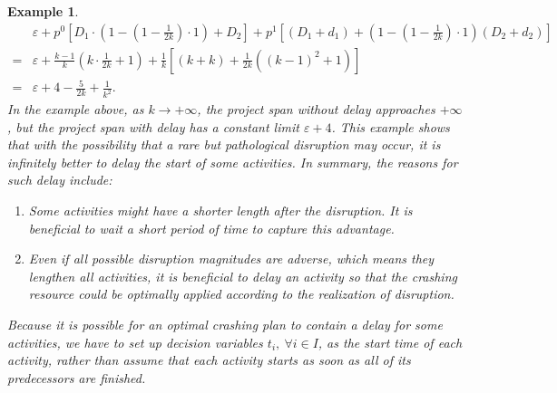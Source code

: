 \documentclass[11pt]{article}
\newtheorem{example}{Example}
\begin{document}
\begin{example}
		\begin{subequations}
			\begin{align}\label{delay}
				&\varepsilon + p^0 \left[D_1 \cdot \left(1 - (1 - \frac{1}{2k}) \cdot 1 \right) + D_2 \right]  + p^1 \left[(D_1 + d_1) + \left(1 - (1 - \frac{1}{2k}) \cdot 1 \right) (D_2 + d_2) \right]\\
				= & \varepsilon + \frac{k - 1}{k} \left(k \cdot \frac{1}{2k} + 1\right) + \frac{1}{k} \left[ (k + k) + \frac{1}{2k} \left((k-1)^2 + 1\right) \right] \\
				= & \varepsilon + 4 - \frac{5}{2k} + \frac{1}{k^2}.
			\end{align}
		\end{subequations}
		In the example above, as \(k \to +\infty\), the project span without delay approaches \(+\infty\), but the project span with delay has a constant limit \(\varepsilon + 4\). This example shows that with the possibility that a rare but pathological disruption may occur, it is infinitely better to delay the start of some activities. In summary, the reasons for such delay include:
		\begin{enumerate}
			\item Some activities might have a shorter length after the disruption. It is beneficial to wait a short period of time to capture this advantage.
			\item Even if all possible disruption magnitudes are adverse, which means they lengthen all activities, it is beneficial to delay an activity so that the crashing resource could be optimally applied according to the realization of disruption.
		\end{enumerate}
		Because it is possible for an optimal crashing plan to contain a delay for some activities, we have to set up decision variables \(t_i,\ \forall i \in I\), as the start time of each activity, rather than assume that each activity starts as soon as all of its predecessors are finished. 
	\end{example}
\end{document}
